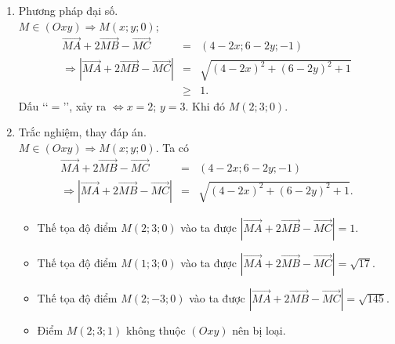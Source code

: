 \begin{ex}
{\begin{enumerate}[\bf Cách 1.]
\begin{eqnarray*}
				&=&\left|2\cdot \vec{MD}+\vec{CB}\right|\\
				&=&\left|2\cdot \vec{MD}+2\cdot \vec{ED}\right|\\
				&=&2\left|2\cdot \vec{FD}\right|\\
				&=&4\cdot FD.
			\end{eqnarray*}
			Ta lại có 
			\begin{itemize}
				\item $M(x;y;0)$, $D\left(\dfrac{5}{2};\dfrac{3}{2};\dfrac{1}{2}\right)$, $E(3;0;0)$, $F\left(\dfrac{x+3}{2};\dfrac{y}{2};0\right)$;
				\item $FD_{\min} \Leftrightarrow$ $F$ là hình chiếu của $D$ trên mp$(Oxy)\Leftrightarrow \heva{&x=2\\&y=3}\Leftrightarrow M(2;3;0)$.
			\end{itemize}
			\item Phương pháp đại số.\\
			$M\in (Oxy)\Rightarrow M(x;y;0)$;
			\begin{eqnarray*}
				\vec{MA}+2\vec{MB}-\vec{MC}&=&(4-2x;6-2y;-1)\\
				\Rightarrow \left|\vec{MA}+2\vec{MB}-\vec{MC}\right|&=&\sqrt{\left(4-2x\right)^2+\left(6-2y\right)^2+1}\\
				& \ge & 1.
			\end{eqnarray*}
			Dấu \lq\lq$=$\rq\rq, xảy ra $\Leftrightarrow x=2$; $y=3$. Khi đó $M(2;3;0)$.
			\item Trắc nghiệm, thay đáp án.\\
			$M\in (Oxy)\Rightarrow M(x;y;0)$. Ta có
			\begin{eqnarray*}
				\vec{MA}+2\vec{MB}-\vec{MC}&=&(4-2x;6-2y;-1)\\
				\Rightarrow \left|\vec{MA}+2\vec{MB}-\vec{MC}\right|&=&\sqrt{(4-2x)^2+(6-2y)^2+1}.
			\end{eqnarray*}
			\begin{itemize}
				\item Thế tọa độ điểm $M(2;3;0)$ vào ta được $\left|\vec{MA}+2\vec{MB}-\vec{MC}\right|=1$.
				\item Thế tọa độ điểm $M(1;3;0)$ vào ta được $\left|\vec{MA}+2\vec{MB}-\vec{MC}\right|=\sqrt{17}$.
				\item Thế tọa độ điểm $M(2;-3;0)$ vào ta được $\left|\vec{MA}+2\vec{MB}-\vec{MC}\right|=\sqrt{145}$.
				\item Điểm $M(2;3;1)$ không thuộc $\left(Oxy\right)$ nên bị loại.
			\end{itemize}
		\end{enumerate}
	}
\end{ex}

